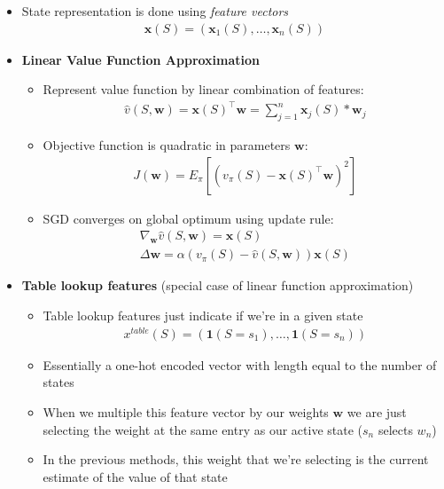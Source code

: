 \documentclass[12pt]{article}
\begin{document}
\begin{itemize}
\begin{itemize}
    \end{itemize}
    \item State representation is done using \textit{feature vectors} 
    \begin{gather*}
      \textbf{x}(S) = (\textbf{x}_1(S), \dots, \textbf{x}_n(S))
    \end{gather*}
    \item \textbf{Linear Value Function Approximation}
    \begin{itemize}
      \item Represent value function by linear combination of features:
      \begin{gather*}
        \hat{v}(S, \textbf{w}) = \textbf{x}(S)^\top \textbf{w} = \sum_{j = 1}^n \textbf{x}_j(S) * \textbf{w}_j
      \end{gather*}
      \item Objective function is quadratic in parameters $\textbf{w}$:
      \begin{gather*}
        J(\textbf{w}) = E_\pi[(v_\pi(S) - \textbf{x}(S)^\top\textbf{w})^2]
      \end{gather*}
      \item SGD converges on global optimum using update rule:
      \begin{gather*}
        \nabla_{\textbf{w}}\hat{v}(S, \textbf{w}) = \textbf{x}(S) \\
        \Delta \textbf{w} = \alpha (v_\pi(S) - \hat{v}(S, \textbf{w}))\textbf{x}(S)
      \end{gather*}
    \end{itemize}
    \item \textbf{Table lookup features} (special case of linear function approximation)
    \begin{itemize}
      \item Table lookup features just indicate if we're in a given state
      \begin{gather*}
        x^{table}(S) = (\textbf{1}(S = s_1), \dots, \textbf{1}(S = s_n))
      \end{gather*}
      \item Essentially a one-hot encoded vector with length equal to the number of states
      \item When we multiple this feature vector by our weights $\textbf{w}$ we are just selecting
      the weight at the same entry as our active state ($s_n$ selects $w_n$)
      \item In the previous methods, this weight that we're selecting is the current estimate of the value of that state

\end{itemize}
\end{itemize}
\end{document}
